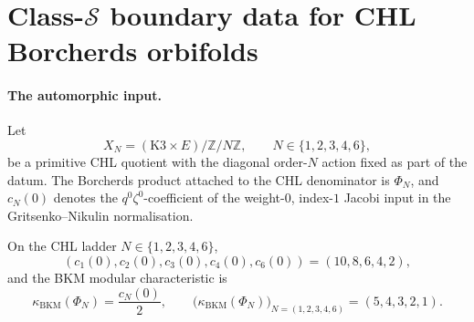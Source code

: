 \section{Class-\texorpdfstring{$\mathcal{S}$}{S} boundary data for CHL Borcherds orbifolds}
\label{wn:sec:class-S-CHL-orbifold-tower}

\providecommand{\kBKM}{\kappa_{\mathrm{BKM}}}
\providecommand{\kcat}{\kappa_{\mathrm{cat}}}
\providecommand{\kch}{\kappa_{\mathrm{ch}}}
\providecommand{\kfib}{\kappa_{\mathrm{fiber}}}
\providecommand{\cfd}{c_{\mathrm{4d}}}
\providecommand{\afd}{a_{\mathrm{4d}}}
\providecommand{\ctd}{c_{\mathrm{2d}}}
\providecommand{\Zmod}[1]{\mathbb{Z}/#1\mathbb{Z}}
\providecommand{\TclassS}[2]{\mathcal{T}[#1,#2]}
\providecommand{\Dfive}{D_5}

\paragraph{The automorphic input.}
Let
\[
  X_N=(\mathrm{K3}\times E)/\Zmod{N},\qquad
  N\in\{1,2,3,4,6\},
\]
be a primitive CHL quotient with the diagonal order-\(N\)
action fixed as part of the datum.  The Borcherds product attached to
the CHL denominator is \(\Phi_N\), and \(c_N(0)\) denotes the
\(q^0\zeta^0\)-coefficient of the weight-\(0\), index-\(1\) Jacobi input
in the Gritsenko--Nikulin normalisation.

\begin{proposition}
\label{prop:classS-CHL-borcherds-constants}
On the CHL ladder \(N\in\{1,2,3,4,6\}\),
\[
  (c_1(0),c_2(0),c_3(0),c_4(0),c_6(0))
  =(10,8,6,4,2),
\]
and the BKM modular characteristic is
\[
  \kBKM(\Phi_N)=\frac{c_N(0)}{2},\qquad
  \bigl(\kBKM(\Phi_N)\bigr)_{N=(1,2,3,4,6)}
  =(5,4,3,2,1).
\]
\end{proposition}

